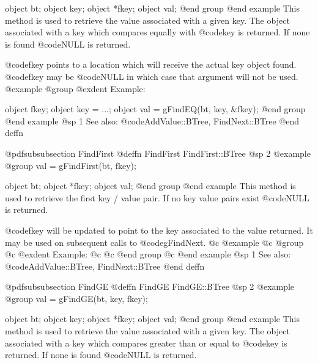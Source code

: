 object  bt;
object  key;
object  *fkey;
object  val;
@end group
@end example
This method is used to retrieve the value associated with a given key.
The object associated with a key which compares equally with @code{key}
is returned.  If none is found @code{NULL} is returned.

@code{fkey} points to a location which will receive the actual key
object found.  @code{fkey} may be @code{NULL} in which case that
argument will not be used.
@example
@group
@exdent Example:

object  fkey;
object  key = ...;
object  val = gFindEQ(bt, key, &fkey);
@end group
@end example
@sp 1
See also:  @code{AddValue::BTree, FindNext::BTree}
@end deffn



















@pdfsubsubsection {FindFirst}
@deffn {FindFirst} FindFirst::BTree
@sp 2
@example
@group
val = gFindFirst(bt, fkey);

object  bt;
object  *fkey;
object  val;
@end group
@end example
This method is used to retrieve the first key / value pair.  If no key
value pairs exist @code{NULL} is returned.

@code{fkey} will be updated to point to the key associated to the value
returned.  It may be used on subsequent calls to @code{gFindNext}.
@c @example
@c @group
@c @exdent Example:
@c 
@c @end group
@c @end example
@sp 1
See also:  @code{AddValue::BTree, FindNext::BTree}
@end deffn




























@pdfsubsubsection {FindGE}
@deffn {FindGE} FindGE::BTree
@sp 2
@example
@group
val = gFindGE(bt, key, fkey);

object  bt;
object  key;
object  *fkey;
object  val;
@end group
@end example
This method is used to retrieve the value associated with a given key.
The object associated with a key which compares greater than or equal to
@code{key} is returned.  If none is found @code{NULL} is returned.

